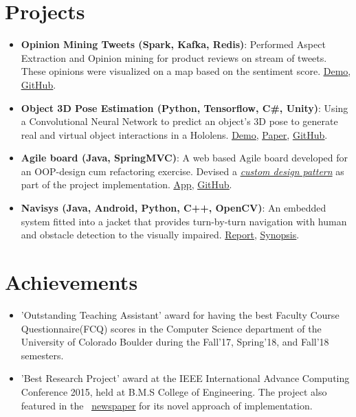 \documentclass[letterpaper,11pt]{article}
\newcommand{\resumeItem}[2]{
  \linespread{1.1}
	\item\small{
    	\textbf{#1}{: #2}
  	}
}
\newcommand{\resumePoint}[1]{
	\linespread{1.2}
	\item\small{#1}
}
\newcommand{\resumeSubItem}[2]{\resumeItem{#1}{#2}\vspace{-4pt}}
\newcommand{\resumeSubHeadingListStart}{\begin{itemize}[leftmargin=*]}
\newcommand{\resumeSubHeadingListEnd}{\end{itemize}\vspace{-14pt}}
\begin{document}
\section{Projects}
  \resumeSubHeadingListStart
  \resumeSubItem{Opinion Mining Tweets (Spark, Kafka, Redis)}
      {Performed Aspect Extraction and Opinion mining for product reviews on stream of tweets. These opinions were visualized on a map based on the sentiment score.\textbf{\faLink}
      \href{https://drive.google.com/file/d/1zUeC4FPc74mw2Z6SB1qXauo8p6Ex2Cc9/view?usp=sharing}{\underline{Demo}},  \href{https://github.com/nikhilsu/Aspect-Extraction-and-Opinion-Mining}{\underline{GitHub}}.}
    \resumeSubItem{Object 3D Pose Estimation (Python, Tensorflow, C\#, Unity)}
      {Using a Convolutional Neural Network to predict an object\rq s 3D pose to generate real and virtual object interactions in a Hololens. \textbf{\faLink}
      \href{https://drive.google.com/file/d/1kCepKQxR73tUTLuvmd1YL3sIbj1GxDdc/view?usp=sharing}{\underline{Demo}}, \href{https://drive.google.com/file/d/1mRwSJ8p2-g-gtBGl1A8seRB8SojWQphm/view?usp=sharing}{\underline{Paper}}, \href{https://github.com/nikhilsu/Object-location-detection}{\underline{GitHub}}.}
    \resumeSubItem{Agile board (Java, SpringMVC)}
      {A web based Agile board developed for an OOP-design cum refactoring exercise. Devised a \href{https://github.com/nikhilsu/Agile-board/blob/master/src/main/java/com/prorg/helper/result/Response.java}{\emph{custom design pattern}} as part of the project implementation. \textbf{\faLink}
      \href{https://prorg.herokuapp.com}{\underline{App}}, \href{https://github.com/nikhilsu/Agile-board}{\underline{GitHub}}.}
    \resumeSubItem{Navisys (Java, Android, Python, C++, OpenCV)}
      {An embedded system fitted into a jacket that provides turn-by-turn navigation with human and obstacle detection to the visually impaired. \textbf{\faLink}
      \href{https://drive.google.com/file/d/1bFHeZ7-7uwZ0spir3YQ7r0maWdLteEtu/view?usp=sharing}{\underline{Report}},
      \href{https://drive.google.com/file/d/1JWB67U2jjTG7cXZFVjRPVGKsv-rRhgUQ/view?usp=sharing}{\underline{Synopsis}}.}
  \resumeSubHeadingListEnd
\vspace{3pt}
\section{Achievements}
  \resumeSubHeadingListStart
    \resumePoint{'Outstanding Teaching Assistant' award for having the best Faculty Course Questionnaire(FCQ) scores in the Computer Science department of the University of Colorado Boulder during the Fall'17, Spring'18, and Fall'18 semesters.}
    \vspace{-5pt}
    \resumePoint{'Best Research Project' award at the IEEE International Advance Computing Conference 2015, held at B.M.S College of Engineering. The project also featured in the \faLink \  \href{https://drive.google.com/open?id=0B0vNhKZyi8qyam1fQ3lfaE1hMkE}{\underline{newspaper}} for its novel approach of implementation.}
  \resumeSubHeadingListEnd
 
\end{document}
